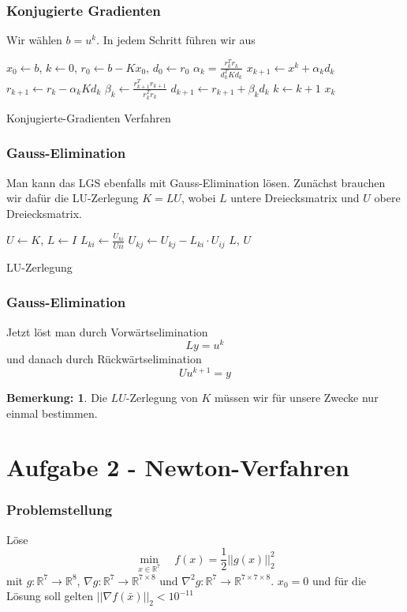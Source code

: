 \documentclass[xcolor = dvipsnames, notheorems, 10pt]{beamer}
\newcommand{\vth}{\vspace{4pt}}
\theoremstyle{definition}
\newtheorem{remark}		{Bemerkung:\vth}
\begin{document}
\begin{frame}
\frametitle{Konjugierte Gradienten}
	Wir wählen $b = u^k$. In jedem Schritt führen wir aus
	\begin{algorithm}[H]
		\begin{algorithmic}[1]
			\STATE $x_0 \gets b$, $k \gets 0$, $r_0 \gets b-Kx_0$, $d_0 \gets r_0$
				\STATE $\alpha_k = \frac{r_k^T r_k}{d_k^T K d_k}$
				\STATE $x_{k+1} \gets x^k + \alpha_k d_k$
				\STATE $r_{k+1} \gets r_k - \alpha_k K d_k$
				\STATE $\beta_k \gets \frac{r_{k+1}^T r_{k+1}}{r_k^T r_k}$
				\STATE $d_{k+1} \gets r_{k+1} + \beta_k d_k$
				\STATE $k \gets k+1$
			\ENDWHILE
			\RETURN $x_k$
		\end{algorithmic}
		\caption{Konjugierte-Gradienten Verfahren}
	\end{algorithm}
\end{frame}

\begin{frame}
\frametitle{Gauss-Elimination}
	Man kann das LGS ebenfalls mit Gauss-Elimination lösen. Zunächst brauchen wir dafür die LU-Zerlegung $K = LU$, wobei $L$ untere Dreiecksmatrix und $U$ obere Dreiecksmatrix.
	\begin{algorithm}[H]
		\begin{algorithmic}[1]
			\STATE $U \gets K$, $L \gets I$
					\STATE $L_{ki} \gets \frac{U_{ki}}{U{ii}}$
						\STATE $U_{kj} \gets U_{kj} - L_{ki} \cdot U_{ij}$
					\ENDFOR
				\ENDFOR
			\ENDFOR
			\RETURN $L$, $U$
		\end{algorithmic}
		\caption{LU-Zerlegung}
	\end{algorithm}
\end{frame}

\begin{frame}
\frametitle{Gauss-Elimination}
	Jetzt löst man durch Vorwärtselimination
	$$Ly = u^{k}$$
	und danach durch Rückwärtselimination
	$$Uu^{k+1} = y$$
	\begin{remark}
		Die $LU$-Zerlegung von $K$ müssen wir für unsere Zwecke nur einmal bestimmen. 
	\end{remark}

\end{frame}

\section{Aufgabe 2 - Newton-Verfahren}
\begin{frame}
\frametitle{Problemstellung}
	Löse
		$$\min_{x \in \mathbb{R}^7} \quad f(x) = \frac{1}{2}||g(x)||_2^2$$
	mit $g: \mathbb{R}^7 \rightarrow \mathbb{R}^8$, $\nabla g: \mathbb{R}^7 \rightarrow \mathbb{R}^{7 \times 8}$ und $\nabla^2 g: \mathbb{R}^7 \rightarrow \mathbb{R}^{7 \times 7 \times 8}$. $x_0 = 0$ und für die Lösung soll gelten $||\nabla f(\bar x)||_2 < 10^{-11}$
	\vfill
\end{frame}
\end{document}
